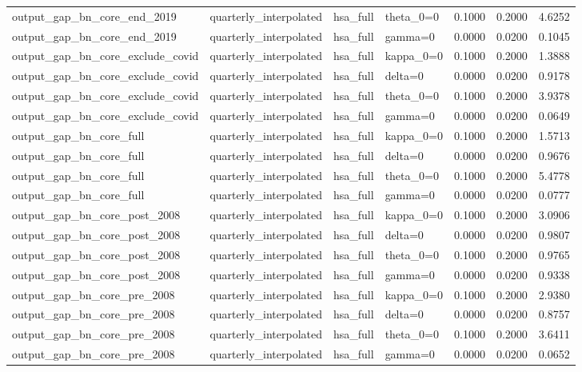 \begin{tabular}{llllrrr}
output\_gap\_bn\_core\_end\_2019 & quarterly\_interpolated & hsa\_full & theta\_0=0 & 0.1000 & 0.2000 & 4.6252 \\
output\_gap\_bn\_core\_end\_2019 & quarterly\_interpolated & hsa\_full & gamma=0 & 0.0000 & 0.0200 & 0.1045 \\
output\_gap\_bn\_core\_exclude\_covid & quarterly\_interpolated & hsa\_full & kappa\_0=0 & 0.1000 & 0.2000 & 1.3888 \\
output\_gap\_bn\_core\_exclude\_covid & quarterly\_interpolated & hsa\_full & delta=0 & 0.0000 & 0.0200 & 0.9178 \\
output\_gap\_bn\_core\_exclude\_covid & quarterly\_interpolated & hsa\_full & theta\_0=0 & 0.1000 & 0.2000 & 3.9378 \\
output\_gap\_bn\_core\_exclude\_covid & quarterly\_interpolated & hsa\_full & gamma=0 & 0.0000 & 0.0200 & 0.0649 \\
output\_gap\_bn\_core\_full & quarterly\_interpolated & hsa\_full & kappa\_0=0 & 0.1000 & 0.2000 & 1.5713 \\
output\_gap\_bn\_core\_full & quarterly\_interpolated & hsa\_full & delta=0 & 0.0000 & 0.0200 & 0.9676 \\
output\_gap\_bn\_core\_full & quarterly\_interpolated & hsa\_full & theta\_0=0 & 0.1000 & 0.2000 & 5.4778 \\
output\_gap\_bn\_core\_full & quarterly\_interpolated & hsa\_full & gamma=0 & 0.0000 & 0.0200 & 0.0777 \\
output\_gap\_bn\_core\_post\_2008 & quarterly\_interpolated & hsa\_full & kappa\_0=0 & 0.1000 & 0.2000 & 3.0906 \\
output\_gap\_bn\_core\_post\_2008 & quarterly\_interpolated & hsa\_full & delta=0 & 0.0000 & 0.0200 & 0.9807 \\
output\_gap\_bn\_core\_post\_2008 & quarterly\_interpolated & hsa\_full & theta\_0=0 & 0.1000 & 0.2000 & 0.9765 \\
output\_gap\_bn\_core\_post\_2008 & quarterly\_interpolated & hsa\_full & gamma=0 & 0.0000 & 0.0200 & 0.9338 \\
output\_gap\_bn\_core\_pre\_2008 & quarterly\_interpolated & hsa\_full & kappa\_0=0 & 0.1000 & 0.2000 & 2.9380 \\
output\_gap\_bn\_core\_pre\_2008 & quarterly\_interpolated & hsa\_full & delta=0 & 0.0000 & 0.0200 & 0.8757 \\
output\_gap\_bn\_core\_pre\_2008 & quarterly\_interpolated & hsa\_full & theta\_0=0 & 0.1000 & 0.2000 & 3.6411 \\
output\_gap\_bn\_core\_pre\_2008 & quarterly\_interpolated & hsa\_full & gamma=0 & 0.0000 & 0.0200 & 0.0652 \\

\end{tabular}
